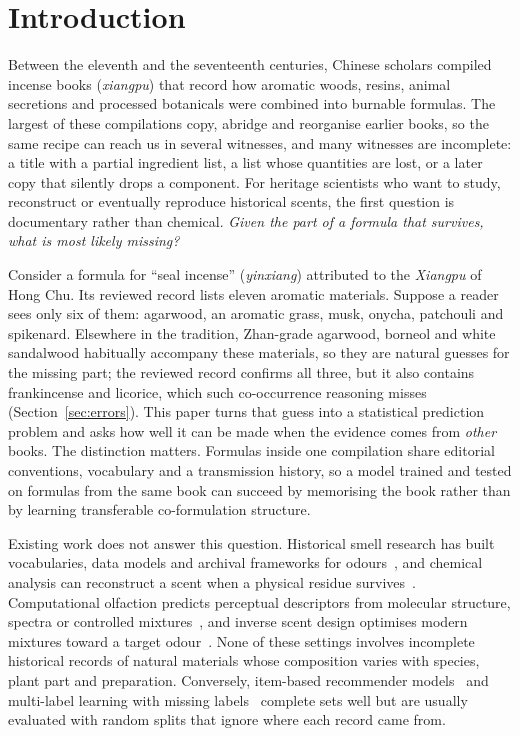 \documentclass[applsci,article,submit,oneauthor]{Definitions/mdpi}
\begin{document}
\section{Introduction}
\label{sec:intro}

Between the eleventh and the seventeenth centuries, Chinese scholars compiled incense books (\emph{xiangpu}) that record how aromatic woods, resins, animal secretions and processed botanicals were combined into burnable formulas. The largest of these compilations copy, abridge and reorganise earlier books, so the same recipe can reach us in several witnesses, and many witnesses are incomplete: a title with a partial ingredient list, a list whose quantities are lost, or a later copy that silently drops a component. For heritage scientists who want to study, reconstruct or eventually reproduce historical scents, the first question is documentary rather than chemical. \emph{Given the part of a formula that survives, what is most likely missing?}

Consider a formula for ``seal incense'' (\emph{yinxiang}) attributed to the \emph{Xiangpu} of Hong Chu. Its reviewed record lists eleven aromatic materials. Suppose a reader sees only six of them: agarwood, an aromatic grass, musk, onycha, patchouli and spikenard. Elsewhere in the tradition, Zhan-grade agarwood, borneol and white sandalwood habitually accompany these materials, so they are natural guesses for the missing part; the reviewed record confirms all three, but it also contains frankincense and licorice, which such co-occurrence reasoning misses (Section~\ref{sec:errors}). This paper turns that guess into a statistical prediction problem and asks how well it can be made when the evidence comes from \emph{other} books. The distinction matters. Formulas inside one compilation share editorial conventions, vocabulary and a transmission history, so a model trained and tested on formulas from the same book can succeed by memorising the book rather than by learning transferable co-formulation structure.

Existing work does not answer this question. Historical smell research has built vocabularies, data models and archival frameworks for odours~\cite{bembibre2017,lisena2022}, and chemical analysis can reconstruct a scent when a physical residue survives~\cite{paolin2026}. Computational olfaction predicts perceptual descriptors from molecular structure, spectra or controlled mixtures~\cite{keller2017,gutierrez2018,lee2023,debnath2021,hamel2024,sisson2025,thomasdanguin2014}, and inverse scent design optimises modern mixtures toward a target odour~\cite{aleixandre2024}. None of these settings involves incomplete historical records of natural materials whose composition varies with species, plant part and preparation. Conversely, item-based recommender models~\cite{steck2019,ning2011,cremonesi2010} and multi-label learning with missing labels~\cite{wu2015,zhao2018} complete sets well but are usually evaluated with random splits that ignore where each record came from.
\end{document}
